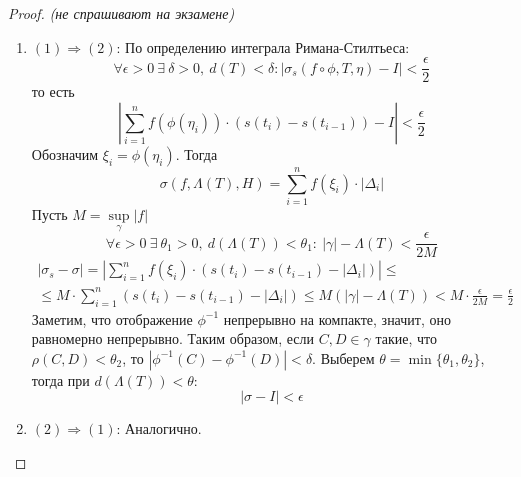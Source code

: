\begin{proof} \textit{(не спрашивают на экзамене)}\tab
    \begin{enumerate}
        \item $(1)\Rightarrow(2)$: По определению интеграла Римана-Стилтьеса: 
        \[\forall \epsilon>0\ \exists\ \delta>0,\ d(T)<\delta: |\sigma_s(f\circ \phi,T,\eta)-I|<\frac{\epsilon}{2}\] 
        то есть 
        \[\left|\sum\limits_{i=1}^{n}f(\phi(\eta_i))\cdot(s(t_i)-s(t_{i-1}))-I\right|<\frac{\epsilon}{2}\]
        Обозначим $\xi_i=\phi(\eta_i)$. Тогда
        \[\sigma(f,\Lambda(T),H)=\sum\limits_{i=1}^{n}f(\xi_i)\cdot |\Delta_i|\]
        Пусть $M=\sup\limits_{\gamma}|f|$
        \[\forall \epsilon>0\ \exists\ \theta_1>0,\ d(\Lambda(T))<\theta_1:\ |\gamma|-\Lambda(T)<\frac{\epsilon}{2M}\]
        \begin{multline*}
            |\sigma_s-\sigma|=\left|\sum\limits_{i=1}^{n}f(\xi_i)\cdot(s(t_i)-s(t_{i-1})-|\Delta_i|)\right|\leq\\
            \leq M\cdot \sum\limits_{i=1}^{n}(s(t_i)-s(t_{i-1})-|\Delta_i|)\leq M(|\gamma|-\Lambda(T))<M\cdot\frac{\epsilon}{2M}=\frac{\epsilon}{2}
        \end{multline*}
        Заметим, что отображение $\phi^{-1}$ непрерывно на компакте, значит, оно равномерно непрерывно. Таким образом, если $C,D\in \gamma$ такие, что $\rho(C,D)<\theta_2$, то $|\phi^{-1}(C)-\phi^{-1}(D)|<\delta$. Выберем $\theta=\min\{\theta_1,\theta_2\}$, тогда при $d(\Lambda(T))<\theta$:
        \[|\sigma-I|<\epsilon\]
        \item $(2)\Rightarrow(1)$: Аналогично.
    \end{enumerate}
\end{proof}
\newpage
